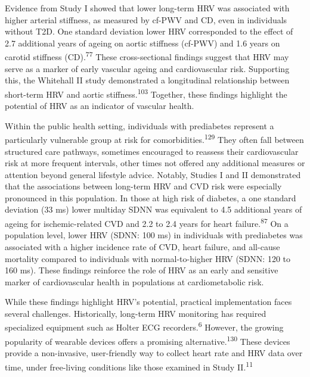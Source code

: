 \documentclass[
  a4paper,
  headsepline=true,
  open=any]{scrbook}
\begin{document}
Evidence from Study I showed that lower long-term HRV was associated
with higher arterial stiffness, as measured by cf-PWV and CD, even in
individuals without T2D. One standard deviation lower HRV corresponded
to the effect of 2.7 additional years of ageing on aortic stiffness
(cf-PWV) and 1.6 years on carotid stiffness (CD).\textsuperscript{77}
These cross-sectional findings suggest that HRV may serve as a marker of
early vascular ageing and cardiovascular risk. Supporting this, the
Whitehall II study demonstrated a longitudinal relationship between
short-term HRV and aortic stiffness.\textsuperscript{103} Together,
these findings highlight the potential of HRV as an indicator of
vascular health.

Within the public health setting, individuals with prediabetes represent
a particularly vulnerable group at risk for
comorbidities.\textsuperscript{129} They often fall between structured
care pathways, sometimes encouraged to reassess their cardiovascular
risk at more frequent intervals, other times not offered any additional
measures or attention beyond general lifestyle advice. Notably, Studies
I and II demonstrated that the associations between long-term HRV and
CVD risk were especially pronounced in this population. In those at high
risk of diabetes, a one standard deviation (33 ms) lower multiday SDNN
was equivalent to 4.5 additional years of ageing for ischemic-related
CVD and 2.2 to 2.4 years for heart failure.\textsuperscript{87} On a
population level, lower HRV (SDNN: 100 ms) in individuals with
prediabetes was associated with a higher incidence rate of CVD, heart
failure, and all-cause mortality compared to individuals with
normal-to-higher HRV (SDNN: 120 to 160 ms). These findings reinforce the
role of HRV as an early and sensitive marker of cardiovascular health in
populations at cardiometabolic risk.

While these findings highlight HRV's potential, practical implementation
faces several challenges. Historically, long-term HRV monitoring has
required specialized equipment such as Holter ECG
recorders.\textsuperscript{6} However, the growing popularity of
wearable devices offers a promising alternative.\textsuperscript{130}
These devices provide a non-invasive, user-friendly way to collect heart
rate and HRV data over time, under free-living conditions like those
examined in Study II.\textsuperscript{11}
\end{document}
